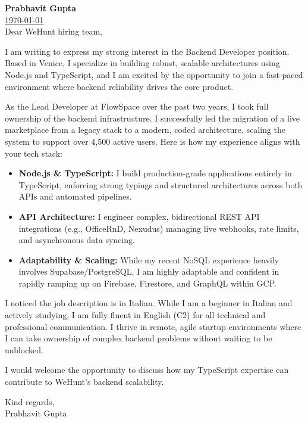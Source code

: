 \documentclass[11pt,a4paper]{article}
\begin{document}
{\Large \textbf{Prabhavit Gupta}} \\[1ex]
  \href{mailto:prabhavitg@gmail.com \\[2ex]
\noindent\rule{\textwidth}{0.4pt} \\[2ex]{prabhavitg@gmail.com} | +39 351 610 7807 |  \urlstyle{same}\href{https://www.linkedin.com/in/prabhavit/}{LinkedIn}
}


\today \\[2ex]
Dear WeHunt hiring team,


I am writing to express my strong interest in the Backend Developer position. Based in Venice, I specialize in building robust, scalable architectures using Node.js and TypeScript, and I am excited by the opportunity to join a fast-paced environment where backend reliability drives the core product.


As the Lead Developer at FlowSpace over the past two years, I took full ownership of the backend infrastructure. I successfully led the migration of a live marketplace from a legacy stack to a modern, coded architecture, scaling the system to support over 4,500 active users. Here is how my experience aligns with your tech stack:


\begin{itemize}
    \item \textbf{Node.js \& TypeScript:} I build production-grade applications entirely in TypeScript, enforcing strong typings and structured architectures across both APIs and automated pipelines.
    \item \textbf{API Architecture:} I engineer complex, bidirectional REST API integrations (e.g., OfficeRnD, Nexudus) managing live webhooks, rate limits, and asynchronous data syncing.
    \item \textbf{Adaptability \& Scaling:} While my recent NoSQL experience heavily involves Supabase/PostgreSQL, I am highly adaptable and confident in rapidly ramping up on Firebase, Firestore, and GraphQL within GCP.
\end{itemize}
\vspace{6pt}

I noticed the job description is in Italian. While I am a beginner in Italian and actively studying, I am fully fluent in English (C2) for all technical and professional communication. I thrive in remote, agile startup environments where I can take ownership of complex backend problems without waiting to be unblocked.


I would welcome the opportunity to discuss how my TypeScript expertise can contribute to WeHunt's backend scalability.


\begin{flushright}
Kind regards, \\[3ex]

Prabhavit Gupta
\end{flushright}
\end{document}
